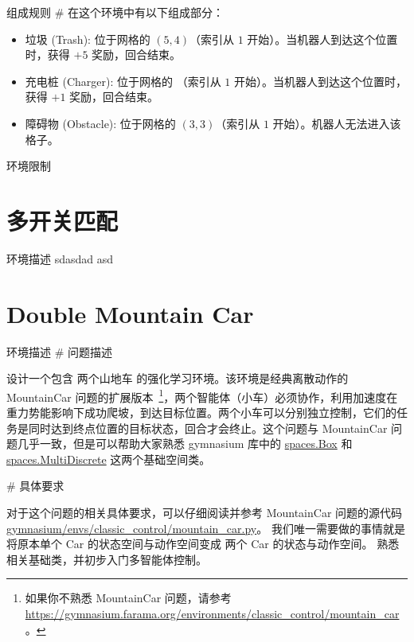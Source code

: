 \documentclass[citestyle=gb7714-2015, bibstyle=gb7714-2015,lang=cn,14pt,scheme=chinese]{elegantbook}
\begin{document}
\begin{theorem*}{组成规则}
    \# 在这个环境中有以下组成部分：
    \begin{itemize}
        \item 垃圾 (Trash): 位于网格的 \(\left( 5, 4 \right)\)（索引从 \(1\) 开始）。当机器人到达这个位置时，获得 \(+5\) 奖励，回合结束。
        \item 充电桩 (Charger): 位于网格的 （索引从 \(1\) 开始）。当机器人到达这个位置时，获得 \(+1\) 奖励，回合结束。
        \item 障碍物 (Obstacle): 位于网格的 \(\left( 3, 3 \right)\)（索引从 \(1\) 开始）。机器人无法进入该格子。
    \end{itemize}
\end{theorem*}

\begin{proposition*}{环境限制}
    
\end{proposition*}

\section{多开关匹配}

\begin{definition*}{环境描述}
    sdasdad asd
\end{definition*}

\section{Double Mountain Car}

\begin{definition*}{环境描述}
\# 问题描述

    设计一个包含 两个山地车 的强化学习环境。该环境是经典离散动作的 MountainCar 问题的扩展版本~\footnote{如果你不熟悉 MountainCar 问题，请参考 \href{https://gymnasium.farama.org/environments/classic_control/mountain_car}{https://gymnasium.farama.org/environments/classic\_control/mountain\_car}。}，两个智能体（小车）必须协作，利用加速度在重力势能影响下成功爬坡，到达目标位置。两个小车可以分别独立控制，它们的任务是同时达到终点位置的目标状态，回合才会终止。这个问题与 MountainCar 问题几乎一致，但是可以帮助大家熟悉 gymnasium 库中的 \href{https://gymnasium.farama.org/api/spaces/fundamental/#gymnasium.spaces.Box}{spaces.Box} 和 \href{https://gymnasium.farama.org/api/spaces/fundamental/#gymnasium.spaces.MultiDiscrete}{spaces.MultiDiscrete} 这两个基础空间类。

\# 具体要求

对于这个问题的相关具体要求，可以仔细阅读并参考 MountainCar 问题的源代码 \href{https://github.com/Farama-Foundation/Gymnasium/blob/main/gymnasium/envs/classic_control/mountain_car.py}{gymnasium/envs/classic\_control/mountain\_car.py}。
我们唯一需要做的事情就是将原本单个 Car 的状态空间与动作空间变成 两个 Car 的状态与动作空间。
熟悉相关基础类，并初步入门多智能体控制。
\end{definition*}
\end{document}
